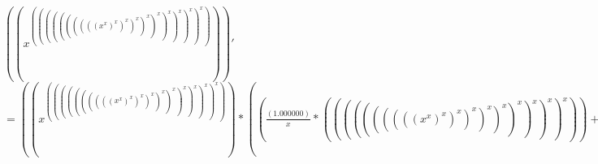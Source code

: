 \documentclass[a4paper, 12 pt]{article}
\begin{document}
	$\left((x^{((((((((((x^{x})^{x})^{x})^{x})^{x})^{x})^{x})^{x})^{x})^{x})})\right)'$
	$= ((x^{((((((((((x^{x})^{x})^{x})^{x})^{x})^{x})^{x})^{x})^{x})^{x})})*((\frac{\left(1.000000\right)}{x}*((((((((((x^{x})^{x})^{x})^{x})^{x})^{x})^{x})^{x})^{x})^{x}))+(ln{x}*(((((((((((x^{x})^{x})^{x})^{x})^{x})^{x})^{x})^{x})^{x})^{x})*(((\frac{\left(1.000000\right)}{(((((((((x^{x})^{x})^{x})^{x})^{x})^{x})^{x})^{x})^{x})}*((((((((((x^{x})^{x})^{x})^{x})^{x})^{x})^{x})^{x})^{x})*(((\frac{\left(1.000000\right)}{((((((((x^{x})^{x})^{x})^{x})^{x})^{x})^{x})^{x})}*(((((((((x^{x})^{x})^{x})^{x})^{x})^{x})^{x})^{x})*(((\frac{\left(1.000000\right)}{(((((((x^{x})^{x})^{x})^{x})^{x})^{x})^{x})}*((((((((x^{x})^{x})^{x})^{x})^{x})^{x})^{x})*(((\frac{\left(1.000000\right)}{((((((x^{x})^{x})^{x})^{x})^{x})^{x})}*(((((((x^{x})^{x})^{x})^{x})^{x})^{x})*(((\frac{\left(1.000000\right)}{(((((x^{x})^{x})^{x})^{x})^{x})}*((((((x^{x})^{x})^{x})^{x})^{x})*(((\frac{\left(1.000000\right)}{((((x^{x})^{x})^{x})^{x})}*(((((x^{x})^{x})^{x})^{x})*(((\frac{\left(1.000000\right)}{(((x^{x})^{x})^{x})}*((((x^{x})^{x})^{x})*(((\frac{\left(1.000000\right)}{((x^{x})^{x})}*(((x^{x})^{x})*(((\frac{\left(1.000000\right)}{(x^{x})}*((x^{x})*((\frac{\left(1.000000\right)}{x}*x)+ln{x})))*x)+ln{(x^{x})})))*x)+ln{((x^{x})^{x})})))*x)+ln{(((x^{x})^{x})^{x})})))*x)+ln{((((x^{x})^{x})^{x})^{x})})))*x)+ln{(((((x^{x})^{x})^{x})^{x})^{x})})))*x)+ln{((((((x^{x})^{x})^{x})^{x})^{x})^{x})})))*x)+ln{(((((((x^{x})^{x})^{x})^{x})^{x})^{x})^{x})})))*x)+ln{((((((((x^{x})^{x})^{x})^{x})^{x})^{x})^{x})^{x})})))*x)+ln{(((((((((x^{x})^{x})^{x})^{x})^{x})^{x})^{x})^{x})^{x})})))))$
\end{document}
